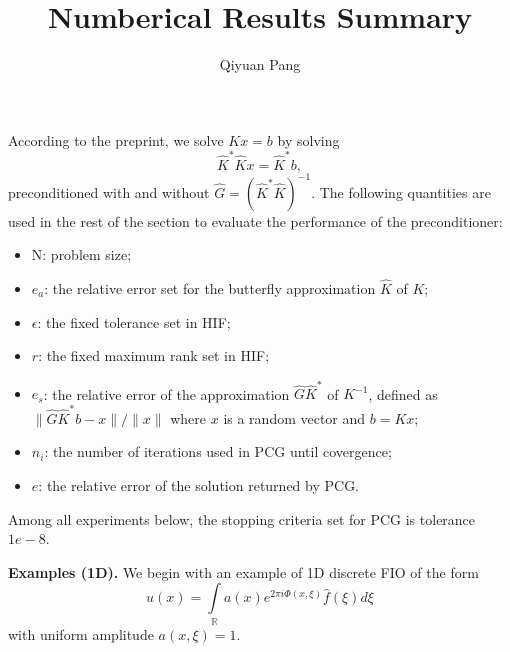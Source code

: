 \documentclass[11pt]{article}
\begin{document}
\title{Numberical Results Summary}
\author{Qiyuan Pang}

\maketitle

According to the preprint, we solve $K x = b$ by solving 
\begin{equation*}
\hat{K}^{*}\hat{K}x = \hat{K}^{*}b,
\end{equation*}
preconditioned with and without $\hat{G} = (\hat{K}^{*}\hat{K})^{-1}$. The following quantities are used in the rest of the section to
evaluate the performance of the preconditioner:

\begin{itemize}
\item N: problem size;
\item $e_{a}$: the relative error set for the butterfly approximation $\hat{K}$ of $K$;
\item $\epsilon$: the fixed tolerance set in HIF;
\item $r$: the fixed maximum rank set in HIF;
\item $e_{s}$: the relative error of the approximation $\hat{G}\hat{K}^{*}$ of $K^{-1}$, defined as $\|\hat{G}\hat{K}^{*}b - x\|/\|x\|$ where $x$ is a random vector and $b = Kx$;
\item $n_{i}$: the number of iterations used in PCG until covergence;
\item $e$: the relative error of the solution returned by PCG.
\end{itemize}

Among all experiments below, the stopping criteria set for PCG is tolerance $1e-8$.

\textbf{Examples (1D).} We begin with an example of 1D discrete FIO of the form
\begin{equation*}
u(x) = \int\limits_{\mathbb{R}}a(x)e^{2\pi i \Phi(x, \xi)}\hat{f}(\xi) d\xi
\end{equation*}
with uniform amplitude $a(x,\xi)=1$. 
\end{document}
